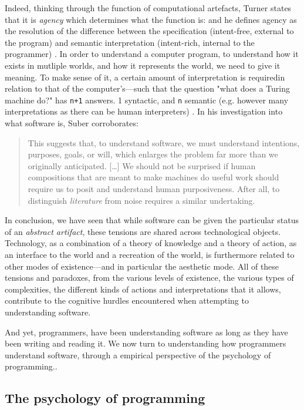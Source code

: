 Indeed, thinking through the function of computational artefacts, Turner states that it is \emph{agency} which determines what the function is: and he defines agency as the resolution of the difference between the specification (intent-free, external to the program) and semantic interpretation (intent-rich, internal to the programmer) \citep{turner_computational_2018}. In order to understand a computer program, to understand how it exists in mutliple worlds, and how it represents the world, we need to give it meaning. To make sense of it, a certain amount of interpretation is requiredin relation to that of the computer's—such that the question "what does a Turing machine do?" has \lstinline{n+1} answers. 1 syntactic, and \lstinline{n} semantic (e.g. however many interpretations as there can be human interpreters) \citep{rapaport_philosophy_2005}. In his investigation into what software is, Suber corroborates:

\begin{quote}
    This suggests that, to understand software, we must understand intentions, purposes, goals, or will, which enlarges the problem far more than we originally anticipated. [\dots] We should not be surprised if human compositions that are meant to make machines do useful work should require us to posit and understand human purposiveness. After all, to distinguish \emph{literature} from noise requires a similar undertaking. \citep{suber_what_1988}
\end{quote}

\spacer

In conclusion, we have seen that while software can be given the particular status of an \emph{abstract artifact}, these tensions are shared across technological objects. Technology, as a combination of a theory of knowledge and a theory of action, as an interface to the world and a recreation of the world, is furthermore related to other modes of existence—and in particular the aesthetic mode. All of these tensions and paradoxes, from the various levels of existence, the various types of complexities, the different kinds of actions and interpretations that it allows, contribute to the cognitive hurdles encountered when attempting to understanding software.

And yet, programmers, have been understanding software as long as they have been writing and reading it. We now turn to understanding how programmers understand software, through a empirical perspective of the psychology of programming..

\subsection{The psychology of programming} %
\label{sec:psychology-programming}

